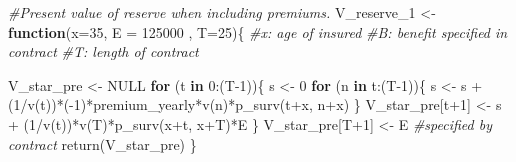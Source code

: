 \documentclass[
]{article}
\newenvironment{Shaded}{\begin{snugshade}}{\end{snugshade}}
\newcommand{\AttributeTok}[1]{\textcolor[rgb]{0.77,0.63,0.00}{#1}}
\newcommand{\CommentTok}[1]{\textcolor[rgb]{0.56,0.35,0.01}{\textit{#1}}}
\newcommand{\ConstantTok}[1]{\textcolor[rgb]{0.00,0.00,0.00}{#1}}
\newcommand{\ControlFlowTok}[1]{\textcolor[rgb]{0.13,0.29,0.53}{\textbf{#1}}}
\newcommand{\DecValTok}[1]{\textcolor[rgb]{0.00,0.00,0.81}{#1}}
\newcommand{\FunctionTok}[1]{\textcolor[rgb]{0.00,0.00,0.00}{#1}}
\newcommand{\NormalTok}[1]{#1}
\newcommand{\OtherTok}[1]{\textcolor[rgb]{0.56,0.35,0.01}{#1}}
\newcommand{\SpecialCharTok}[1]{\textcolor[rgb]{0.00,0.00,0.00}{#1}}
\begin{document}
\begin{Shaded}
\begin{Highlighting}[]
\CommentTok{\#Present value of reserve when including premiums. }
\NormalTok{V\_reserve\_1 }\OtherTok{\textless{}{-}} \ControlFlowTok{function}\NormalTok{(}\AttributeTok{x=}\DecValTok{35}\NormalTok{, }\AttributeTok{E =} \DecValTok{125000}\NormalTok{ , }\AttributeTok{T=}\DecValTok{25}\NormalTok{)\{}
  \CommentTok{\#x: age of insured}
  \CommentTok{\#B: benefit specified in contract}
  \CommentTok{\#T: length of contract }
  
\NormalTok{  V\_star\_pre }\OtherTok{\textless{}{-}} \ConstantTok{NULL}
  \ControlFlowTok{for}\NormalTok{ (t }\ControlFlowTok{in} \DecValTok{0}\SpecialCharTok{:}\NormalTok{(T}\DecValTok{{-}1}\NormalTok{))\{}
\NormalTok{    s }\OtherTok{\textless{}{-}} \DecValTok{0} 
    \ControlFlowTok{for}\NormalTok{ (n }\ControlFlowTok{in}\NormalTok{ t}\SpecialCharTok{:}\NormalTok{(T}\DecValTok{{-}1}\NormalTok{))\{}
\NormalTok{      s }\OtherTok{\textless{}{-}}\NormalTok{ s }\SpecialCharTok{+}\NormalTok{ (}\DecValTok{1}\SpecialCharTok{/}\FunctionTok{v}\NormalTok{(t))}\SpecialCharTok{*}\NormalTok{(}\SpecialCharTok{{-}}\DecValTok{1}\NormalTok{)}\SpecialCharTok{*}\NormalTok{premium\_yearly}\SpecialCharTok{*}\FunctionTok{v}\NormalTok{(n)}\SpecialCharTok{*}\FunctionTok{p\_surv}\NormalTok{(t}\SpecialCharTok{+}\NormalTok{x, n}\SpecialCharTok{+}\NormalTok{x)}
\NormalTok{    \}}
\NormalTok{    V\_star\_pre[t}\SpecialCharTok{+}\DecValTok{1}\NormalTok{] }\OtherTok{\textless{}{-}}\NormalTok{ s  }\SpecialCharTok{+}\NormalTok{ (}\DecValTok{1}\SpecialCharTok{/}\FunctionTok{v}\NormalTok{(t))}\SpecialCharTok{*}\FunctionTok{v}\NormalTok{(T)}\SpecialCharTok{*}\FunctionTok{p\_surv}\NormalTok{(x}\SpecialCharTok{+}\NormalTok{t, x}\SpecialCharTok{+}\NormalTok{T)}\SpecialCharTok{*}\NormalTok{E }
\NormalTok{  \}}
\NormalTok{  V\_star\_pre[T}\SpecialCharTok{+}\DecValTok{1}\NormalTok{] }\OtherTok{\textless{}{-}}\NormalTok{ E }\CommentTok{\#specified by contract }
  \FunctionTok{return}\NormalTok{(V\_star\_pre)}
\NormalTok{\} }
\end{Highlighting}
\end{Shaded}

\newpage
\end{document}
